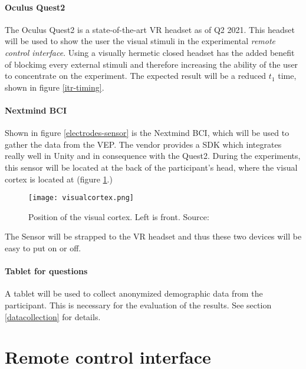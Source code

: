             \paragraph{Oculus Quest2}

                The Oculus Quest2 is a state-of-the-art VR headset as of Q2 2021. This headset will be used to show the user the visual stimuli in the experimental \textit{remote control interface}. Using a visually hermetic closed headset has the added benefit of blockimg every external stimuli and therefore increasing the ability of the user to concentrate on the experiment. The expected result will be a reduced $t_{1}$ time, shown in figure \ref*{itr-timing}.

            \paragraph{Nextmind BCI}                

                Shown in figure \ref*{electrodes-sensor} is the Nextmind BCI, which will be used to gather the data from the VEP. The vendor provides a SDK which integrates really well in Unity and in consequence with the Quest2. During the experiments, this sensor will be located at the back of the participant's head, where the visual cortex is located at (figure \ref*{visual-cortex}.)

                \begin{figure}[h]     %
                    \centering
                    \texttt{[image: visualcortex.png]} 
                    \caption{Position of the visual cortex. Left is front. Source: \cite{Dr.KenBrodaBahm.14062021}}\label{visual-cortex}
                \end{figure}

                The Sensor will be strapped to the VR headset and thus these two devices will be easy to put on or off.

            \paragraph{Tablet for questions}

                A tablet will be used to collect anonymized demographic data from the participant. This is necessary for the evaluation of the results. See section \ref*{datacollection} for details.

        \section{Remote control interface}
        
